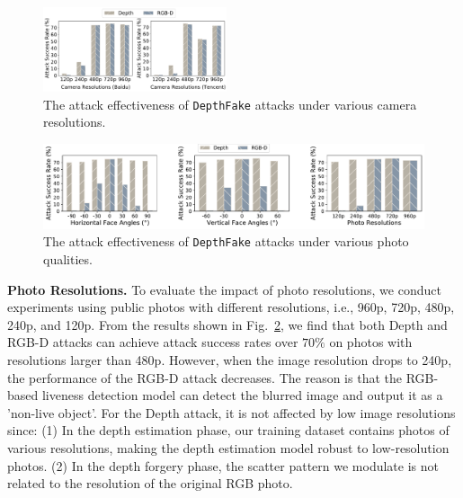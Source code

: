 \begin{figure}[pt]
	\centerline{\includegraphics[width = 0.48\textwidth]{figures/camera_resolution.pdf}}
	\vspace{-0.05in}
	\caption{The attack effectiveness of \texttt{DepthFake} attacks under various camera resolutions.}
	\label{camera_resolution}
	\vspace{-0.15in}
\end{figure}


\begin{figure}[pt]
	\centerline{\includegraphics[width = \textwidth]{figures/photo_quality.pdf}}
	\vspace{-0.15in}
	\caption{The attack effectiveness of \texttt{DepthFake} attacks under various photo qualities. }
	\label{photo_quality}
	\vspace{-0.15in}
\end{figure}



\textbf{Photo Resolutions.}
To evaluate the impact of photo resolutions, we conduct experiments using public photos with different resolutions, i.e., 960p, 720p, 480p, 240p, and 120p. From the results shown in Fig.~\ref{photo_quality}, we find that both Depth and  RGB-D attacks can achieve attack success rates over $70\%$ on photos with resolutions larger than 480p. 
However, when the image resolution drops to 240p, the performance of the RGB-D attack decreases.
The reason is that the RGB-based liveness detection model can detect the blurred image and output it as a 'non-live object'. 
For the Depth attack, it is not affected by low image resolutions since: (1) In the depth estimation phase, our training dataset contains photos of various resolutions, making the depth estimation model robust to low-resolution photos. (2) In the depth forgery phase, the scatter pattern we modulate is not related to the resolution of the original RGB photo.

